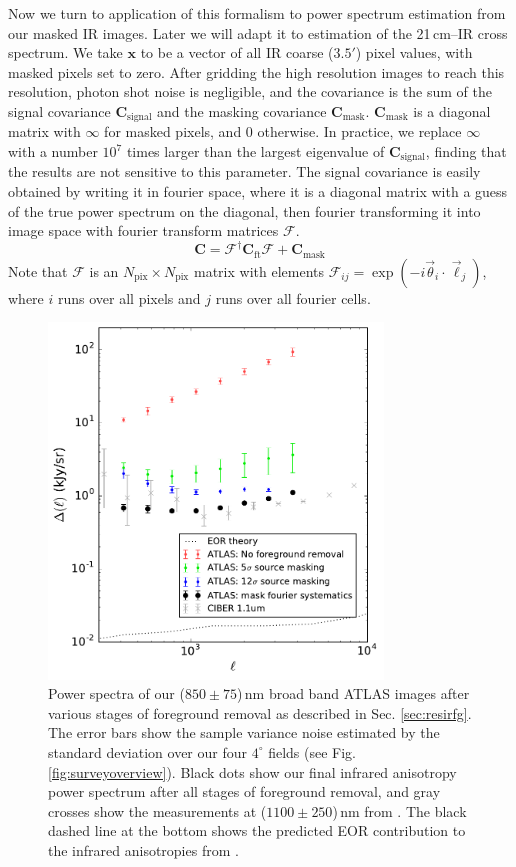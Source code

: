\documentclass{emulateapj}
\newcommand{\Cb}{\mathbf{C}}
\newcommand{\xb}{\mathbf{x}}
\begin{document}
Now we turn to application of this formalism to power spectrum estimation from our masked IR images. Later we will adapt it to estimation of the 21\,cm--IR cross spectrum. We take $\xb$ to be a vector of all IR coarse ($3.5'$) pixel values, with masked pixels set to zero. After gridding the high resolution images to reach this resolution, photon shot noise is negligible, and the covariance is the sum of the signal covariance $\Cb_\text{signal}$ and the masking covariance $\Cb_\text{mask}$. $\Cb_\text{mask}$ is a diagonal matrix with $\infty$ for masked pixels, and 0 otherwise. In practice, we replace $\infty$ with a number $10^7$ times larger than the largest eigenvalue of $\Cb_\text{signal}$, finding that the results are not sensitive to this parameter. The signal covariance is easily obtained by writing it in fourier space, where it is a diagonal matrix with a guess of the true power spectrum on the diagonal, then fourier transforming it into image space with fourier transform matrices $\mathcal{F}$. 
\begin{equation}
\label{eqn:covFTwithmask}
	\Cb = \mathcal{F}^\dagger\Cb_\text{ft}\mathcal{F}+\Cb_\text{mask}
\end{equation}
Note that $\mathcal{F}$ is an $N_\text{pix}\times N_\text{pix}$ matrix with elements $\mathcal{F}_{ij}=\exp(-i \vec{\theta}_i\cdot\vec{\ell}_j)$, where $i$ runs over all pixels and $j$ runs over all fourier cells. 

\begin{figure}[h]
\centering
\includegraphics[width=3.5in]{images/big_foreground_masking_study_pspecs_2_magoffset=20_56+0_274.pdf}
\caption{Power spectra of our ($850\pm75$)\,nm broad band ATLAS images after various stages of foreground removal as described in Sec. \ref{sec:resirfg}. The error bars show the sample variance noise estimated by the standard deviation over our four $4^\circ$ fields (see Fig. \ref{fig:surveyoverview}). Black dots show our final infrared anisotropy power spectrum after all stages of foreground removal, and gray crosses show the measurements at ($1100\pm250$)\,nm from \citet{zemcov14}. The black dashed line at the bottom shows the predicted EOR contribution to the infrared anisotropies from \citet{zemcov14}.}
\label{fig:bigfgmaskingstudypspecs}
\end{figure}
\end{document}
